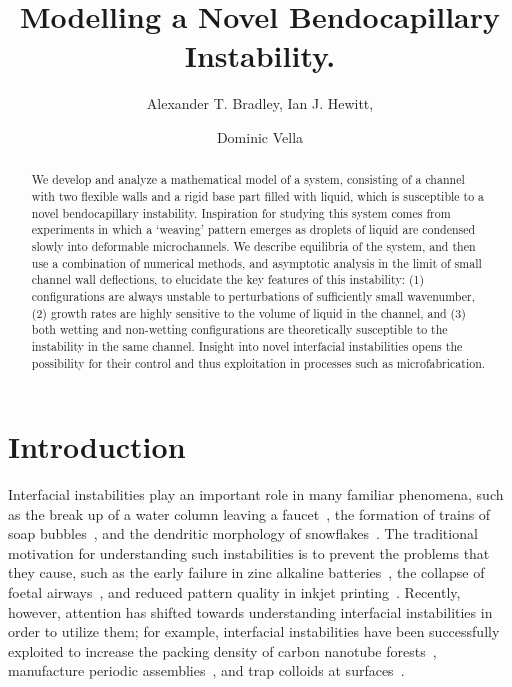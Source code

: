\documentclass{jfm}
\title{Modelling a Novel Bendocapillary Instability.}
\author{Alexander T. Bradley\aff{1},
  Ian J. Hewitt\aff{1},
 \and Dominic Vella\aff{1} \corresp{\email{vella@maths.ox.ac.uk}}}
\affiliation{\aff{1} Mathematical Institute, University of Oxford, Woodstock Rd, Oxford, OX2 6GG, United Kingdom}
\begin{document}
\maketitle

\begin{abstract}
We develop and analyze a mathematical model of a system, consisting of a channel with two flexible walls and a rigid base part filled with liquid, which is susceptible to a novel bendocapillary instability. Inspiration for studying this system comes from experiments in which a `weaving' pattern emerges as droplets of liquid are condensed slowly into deformable microchannels. We describe equilibria of the system, and then use a combination of numerical methods, and asymptotic analysis in the limit of small channel wall deflections, to elucidate the key features of this instability: (1) configurations are always unstable to perturbations of sufficiently small wavenumber, (2) growth rates are highly sensitive to the volume of liquid in the channel, and (3) both wetting and non-wetting configurations are theoretically susceptible to the instability in the same channel. Insight into novel interfacial instabilities opens the possibility for their control and thus exploitation in processes such as microfabrication.
\end{abstract}


\graphicspath{{./figures/}}

\section{Introduction}\label{S:Introduction}
Interfacial instabilities play an important role in many familiar phenomena, such as the break up of a water column leaving a faucet~\citep{Plateau1873, Rayleigh1879PRSL}, the formation of trains of soap bubbles~\citep{Eggers2008RepProgPhys}, and the dendritic morphology of snowflakes~\citep{Langer1980RevModPhys}. The traditional motivation for understanding such instabilities is to prevent the problems that they cause, such as the early failure in zinc alkaline batteries~\citep{Gallaway2010Electrochem}, the collapse of foetal airways~\citep{Halpern1992JFM}, and reduced pattern quality in inkjet printing~\citep{Calvert2007Science}. Recently, however, attention has shifted towards understanding interfacial instabilities in order to utilize them; for example, interfacial instabilities have been successfully exploited to increase the packing density of carbon nanotube forests~\citep{Chakrapani2004PNAS}, manufacture periodic assemblies~\cite[e.g.][]{DeVolder2013Angewandte}, and trap colloids at surfaces~\citep{Pokroy2009Science}.
\end{document}
